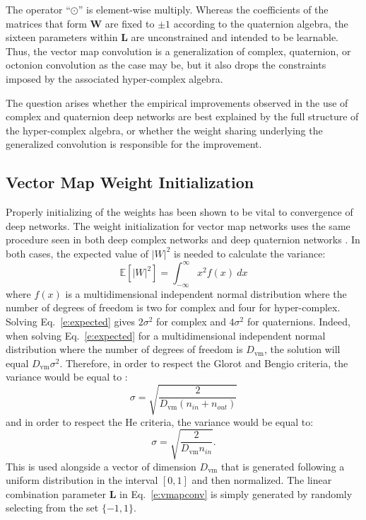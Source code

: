 \documentclass[14pt,a4paper]{article}
\begin{document}
\noindent
The operator ``$\odot$'' is element-wise multiply.
Whereas the coefficients of the matrices that form $\mathbf{W}$ are fixed to $\pm1$ according to the quaternion algebra,
the sixteen parameters within $\mathbf{L}$ are unconstrained and intended to be learnable.
Thus, the vector map convolution is a generalization of complex, quaternion, or octonion convolution as the case may be,
but it also drops the constraints imposed by the associated hyper-complex algebra.

The question arises whether the empirical improvements observed in the use of complex and quaternion deep networks are best explained by the full structure of the hyper-complex algebra, or whether the weight sharing underlying the generalized
convolution is responsible for the improvement.

\subsection{Vector Map Weight Initialization}
Properly initializing of the weights has been shown to be vital to convergence of deep networks.
The weight initialization for vector map networks uses the same procedure seen in both deep complex networks \cite{trabelsi+al-2018-complexconv} and deep quaternion networks \cite{Gaudet2018}.
In both cases, the expected value of $|W|^2$ is needed to calculate the variance:
\begin{equation}
\mathbb{E}[|W|^2] = \int_{-\infty}^\infty x^2 f(x) ~dx
\label{e:expected}
\end{equation}
where $f(x)$ is a multidimensional independent normal distribution where the number of degrees of freedom is two for complex and four for hyper-complex.
Solving Eq.~\ref{e:expected} gives $2\sigma^2$ for complex and $4\sigma^2$ for quaternions.
Indeed, when solving Eq.~\ref{e:expected} for a multidimensional independent normal distribution where the number of degrees of freedom is $D_\mathrm{vm}$, the solution will equal $D_\mathrm{vm}\sigma^2$.
Therefore, in order to respect the Glorot and Bengio \cite{glorot2010understanding} criteria, the variance would be equal to :
\begin{equation}
\sigma = \sqrt{\frac{2}{D_\mathrm{vm}(n_{in} + n_{out})}}
\label{e:vmap-glorot}
\end{equation}
and in order to respect the He \cite{he2015delving} criteria, the variance would be equal to:
\begin{equation}
\sigma = \sqrt{\frac{2}{D_\mathrm{vm}n_{in}}}.
\label{e:vmap-he}
\end{equation}
This is used alongside a vector of dimension $D_\mathrm{vm}$ that is generated following a uniform distribution in the interval $[0, 1]$ and then normalized. The linear combination parameter $\textbf{L}$ in Eq.~\ref{e:vmapconv} is simply generated by randomly selecting from the set  $\{-1, 1\}$.
\end{document}
